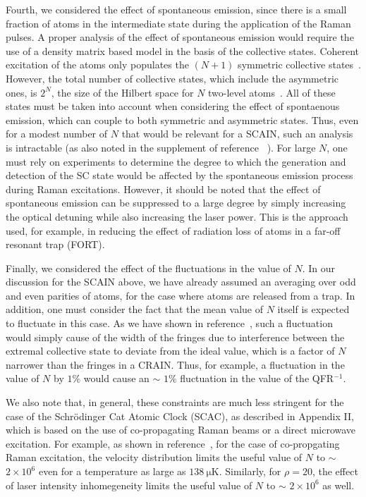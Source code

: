 \documentclass[aps,pra,letterpaper,superscriptaddress,showpacs,amsmath,floats,twocolumn]{revtex4-1}
\begin{document}
Fourth, we considered the effect of spontaneous emission, since there is a small fraction of atoms in the intermediate state during the application of the Raman pulses. A proper analysis of the effect of spontaneous emission would require the use of a density matrix based model in the basis of the collective states. Coherent excitation of the atoms only populates the $(N+1)$ symmetric collective states~\cite{Dicke, Arecchi, CollectiveDescription}. However, the total number of collective states, which include the asymmetric ones, is $2^{N}$, the size of the Hilbert space for $N$ two-level atoms~\cite{CollectiveDescription}. All of these states must be taken into account when considering the effect of spontaenous emission, which can couple to both symmetric and asymmetric states. Thus, even for a modest number of $N$ that would be relevant for a SCAIN, such an analysis is intractable (as also noted in the supplement of reference ~\cite{Antisqz}). For large $N$, one must rely on experiments to determine the degree to which the generation and detection of the SC state would be affected by the spontaneous emission process during Raman excitations. However, it should be noted that the effect of spontaneous emission can be suppressed to a large degree by simply increasing the optical detuning while also increasing the laser power. This is the approach used, for example, in reducing the effect of radiation loss of atoms in a far-off resonant trap (FORT). 

Finally, we considered the effect of the fluctuations in the value of $N$. In our discussion for the SCAIN above, we have already assumed an averaging over odd and even parities of atoms, for the case where atoms are released from a trap. In addition, one must consider the fact that the mean value of $N$ itself is expected to fluctuate in this case. As we have shown in reference~\cite{COSAIN}, such a fluctuation would simply cause of the width of the fringes due to interference between the extremal collective state to deviate from the ideal value, which is a factor of $N$ narrower than the fringes in a CRAIN. Thus, for example, a fluctuation in the value of $N$ by $1\%$ would cause an $\sim$ $1\%$ fluctuation in the value of the QFR$^{-1}$. 

We also note that, in general, these constraints are much less stringent for the case of the Schr\"odinger Cat Atomic Clock (SCAC), as described in Appendix II, which is based on the use of co-propagating Raman beams or a direct microwave excitation. For example, as shown in reference~\cite{COSAC}, for the case of co-propgating Raman excitation, the velocity distribution limits the useful value of $N$ to $\sim$ $2 \times 10^6$ even for a temperature as large as $\SI{138}{\micro\kelvin}$. Similarly, for $\rho = 20$, the effect of laser intensity inhomegeneity limits the useful value of $N$ to $\sim$ $2 \times 10^6$ as well. 
\end{document}

